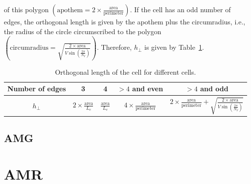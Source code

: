\documentclass[preprint,10pt]{elsarticle}
\newcommand{\tbl}[1]{Table~\ref{#1}}                     %
\renewcommand{\(}{\left(}
\renewcommand{\)}{\right)}
\renewcommand{\[}{\left[}
\renewcommand{\]}{\right]}
\begin{document}
of this polygon $\(\textrm{apothem}=2\times
\frac{\textrm{area}}{\textrm{perimeter}}\)$. If the cell has an odd number of
edges, the orthogonal length is given by the apothem plus the circumradius,
i.e., the radius of the circle circumscribed to the polygon
$\(\textrm{circumradius}=\sqrt{\frac{2\times\textrm{area}}{V \sin
\(\frac{2\pi}{N_V}\)}}\)$. Therefore, $h_{\bot}$ is given by
\tbl{tab:ortho_length}.
\begin{table}[!htbp]
  \begin{centering}
    \begin{tabular}{|c|c|c|c|c|}
      \hline
      Number of edges & 3 & 4 & $> 4$ and even & $>4$ and odd \\
      \hline
      $h_{\bot}$ & $2\times \frac{\textrm{area}}{L_e}$ &
      $\frac{\textrm{area}}{L_e}$ & $4\times
      \frac{\textrm{area}}{\textrm{perimeter}}$ &
      $2\times \frac{\textrm{area}}{\textrm{perimeter}} +
      \sqrt{\frac{2\times\textrm{area}}{V \sin\(\frac{2\pi}{N_V}\)}}$\\
      \hline
    \end{tabular}
    \caption{Orthogonal length of the cell for different cells.}
  \end{centering}
  \label{tab:ortho_length}
\end{table}

\subsection{AMG}

\section{AMR} \label{sec:amr}
\end{document}
